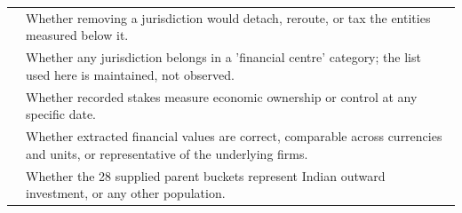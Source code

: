 \begin{tabular}{>{\raggedright\arraybackslash}p{}>{\raggedright\arraybackslash}p{}}
 & Whether removing a jurisdiction would detach, reroute, or tax the entities measured below it. \\
 & Whether any jurisdiction belongs in a 'financial centre' category; the list used here is maintained, not observed. \\
 & Whether recorded stakes measure economic ownership or control at any specific date. \\
 & Whether extracted financial values are correct, comparable across currencies and units, or representative of the underlying firms. \\
 & Whether the 28 supplied parent buckets represent Indian outward investment, or any other population. \\
\bottomrule
\end{tabular}
